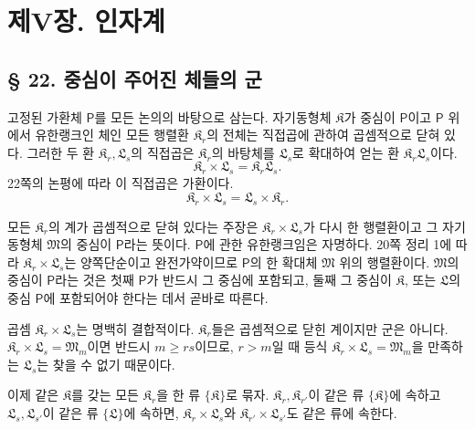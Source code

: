 \section*{제V장. 인자계}

\subsection*{§ 22. 중심이 주어진 체들의 군}

고정된 가환체 \(\mathsf P\)를 모든 논의의 바탕으로 삼는다. 자기동형체 \(\mathfrak K\)가 중심이 \(\mathsf P\)이고 \(\mathsf P\) 위에서 유한랭크인 체인 모든 행렬환 \(\mathfrak K_r\)의 전체는 \glqq{}직접곱\grqq{}에 관하여 곱셈적으로 닫혀 있다. 그러한 두 환 \(\mathfrak K_r,\mathfrak L_s\)의 직접곱은 \(\mathfrak K_r\)의 바탕체를 \(\mathfrak L_s\)로 확대하여 얻는 환 \(\mathfrak K_r\mathfrak L_s\)이다.
\[
        \mathfrak K_r\times\mathfrak L_s
        =\mathfrak K_r\mathfrak L_s.
\]
22쪽의 논평에 따라 이 직접곱은 가환이다.
\[
        \mathfrak K_r\times\mathfrak L_s
        =\mathfrak L_s\times\mathfrak K_r.
\]

모든 \(\mathfrak K_r\)의 계가 곱셈적으로 닫혀 있다는 주장은 \(\mathfrak K_r\times\mathfrak L_s\)가 다시 한 행렬환이고 그 자기동형체 \(\mathfrak M\)의 중심이 \(\mathsf P\)라는 뜻이다. \(\mathsf P\)에 관한 유한랭크임은 자명하다. 20쪽 정리 1에 따라 \(\mathfrak K_r\times\mathfrak L_s\)는 양쪽단순이고 완전가약이므로 \(\mathsf P\)의 한 확대체 \(\mathfrak M\) 위의 행렬환이다. \(\mathfrak M\)의 중심이 \(\mathsf P\)라는 것은 첫째 \(\mathsf P\)가 반드시 그 중심에 포함되고, 둘째 그 중심이 \(\mathfrak K\), 또는 \(\mathfrak L\)의 중심 \(\mathsf P\)에 포함되어야 한다는 데서 곧바로 따른다.

곱셈 \(\mathfrak K_r\times\mathfrak L_s\)는 명백히 결합적이다. \(\mathfrak K_r\)들은 곱셈적으로 닫힌 계이지만 군은 아니다. \(\mathfrak K_r\times\mathfrak L_s=\mathfrak M_m\)이면 반드시 \(m\geq rs\)이므로, \(r>m\)일 때 등식 \(\mathfrak K_r\times\mathfrak L_s=\mathfrak M_m\)을 만족하는 \(\mathfrak L_s\)는 찾을 수 없기 때문이다.

이제 같은 \(\mathfrak K\)를 갖는 모든 \(\mathfrak K_r\)을 한 류 \(\{\mathfrak K\}\)로 묶자. \(\mathfrak K_r,\mathfrak K_{r'}\)이 같은 류 \(\{\mathfrak K\}\)에 속하고 \(\mathfrak L_s,\mathfrak L_{s'}\)이 같은 류 \(\{\mathfrak L\}\)에 속하면, \(\mathfrak K_r\times\mathfrak L_s\)와 \(\mathfrak K_{r'}\times\mathfrak L_{s'}\)도 같은 류에 속한다.

